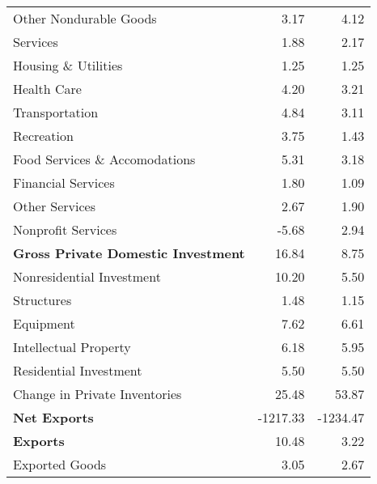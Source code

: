 \documentclass[11pt, letterpaper]{article}\usepackage[]{graphicx}\usepackage[]{color}
\begin{document}
\begin{table}[H]
\begin{tabular}{lrr}
  \hspace{24mm}  Other Nondurable Goods & 3.17 & 4.12 \\ 
  \hspace{8mm}  Services & 1.88 & 2.17 \\ 
  \hspace{16mm}  Housing \& Utilities & 1.25 & 1.25 \\ 
  \hspace{16mm}  Health Care & 4.20 & 3.21 \\ 
  \hspace{16mm}  Transportation & 4.84 & 3.11 \\ 
  \hspace{16mm}  Recreation & 3.75 & 1.43 \\ 
  \hspace{16mm}  Food Services \& Accomodations & 5.31 & 3.18 \\ 
  \hspace{16mm}  Financial Services & 1.80 & 1.09 \\ 
  \hspace{16mm}  Other Services & 2.67 & 1.90 \\ 
  \hspace{16mm}  Nonprofit Services & -5.68 & 2.94 \\ 
  \hspace{0mm} \textbf{Gross Private Domestic Investment} & 16.84 & 8.75 \\ 
  \hspace{8mm}  Nonresidential Investment & 10.20 & 5.50 \\ 
  \hspace{16mm}  Structures & 1.48 & 1.15 \\ 
  \hspace{16mm}  Equipment & 7.62 & 6.61 \\ 
  \hspace{16mm}  Intellectual Property & 6.18 & 5.95 \\ 
  \hspace{8mm}  Residential Investment & 5.50 & 5.50 \\ 
  \hspace{8mm}  Change in Private Inventories & 25.48 & 53.87 \\ 
  \hspace{0mm} \textbf{Net Exports} & -1217.33 & -1234.47 \\ 
  \hspace{0mm} \textbf{Exports} & 10.48 & 3.22 \\ 
  \hspace{8mm}  Exported Goods & 3.05 & 2.67 \\ 

\end{tabular}
\end{table}
\end{document}
